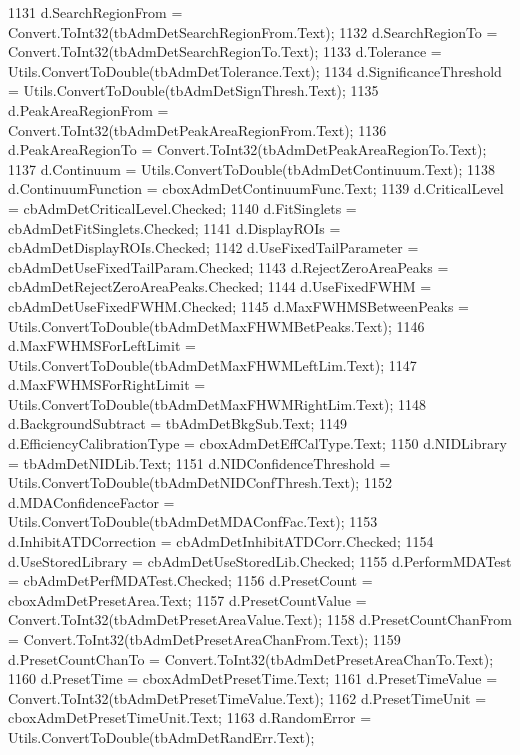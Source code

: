 \begin{DoxyCode}
1131                 d.SearchRegionFrom = Convert.ToInt32(tbAdmDetSearchRegionFrom.Text);
1132                 d.SearchRegionTo = Convert.ToInt32(tbAdmDetSearchRegionTo.Text);
1133                 d.Tolerance = Utils.ConvertToDouble(tbAdmDetTolerance.Text);
1134                 d.SignificanceThreshold = Utils.ConvertToDouble(tbAdmDetSignThresh.Text);
1135                 d.PeakAreaRegionFrom = Convert.ToInt32(tbAdmDetPeakAreaRegionFrom.Text);
1136                 d.PeakAreaRegionTo = Convert.ToInt32(tbAdmDetPeakAreaRegionTo.Text);
1137                 d.Continuum = Utils.ConvertToDouble(tbAdmDetContinuum.Text);
1138                 d.ContinuumFunction = cboxAdmDetContinuumFunc.Text;
1139                 d.CriticalLevel = cbAdmDetCriticalLevel.Checked;
1140                 d.FitSinglets = cbAdmDetFitSinglets.Checked;
1141                 d.DisplayROIs = cbAdmDetDisplayROIs.Checked;
1142                 d.UseFixedTailParameter = cbAdmDetUseFixedTailParam.Checked;
1143                 d.RejectZeroAreaPeaks = cbAdmDetRejectZeroAreaPeaks.Checked;
1144                 d.UseFixedFWHM = cbAdmDetUseFixedFWHM.Checked;
1145                 d.MaxFWHMSBetweenPeaks = Utils.ConvertToDouble(tbAdmDetMaxFHWMBetPeaks.Text);
1146                 d.MaxFWHMSForLeftLimit = Utils.ConvertToDouble(tbAdmDetMaxFHWMLeftLim.Text);
1147                 d.MaxFWHMSForRightLimit = Utils.ConvertToDouble(tbAdmDetMaxFHWMRightLim.Text);
1148                 d.BackgroundSubtract = tbAdmDetBkgSub.Text;
1149                 d.EfficiencyCalibrationType = cboxAdmDetEffCalType.Text;
1150                 d.NIDLibrary = tbAdmDetNIDLib.Text;
1151                 d.NIDConfidenceThreshold = Utils.ConvertToDouble(tbAdmDetNIDConfThresh.Text);
1152                 d.MDAConfidenceFactor = Utils.ConvertToDouble(tbAdmDetMDAConfFac.Text);
1153                 d.InhibitATDCorrection = cbAdmDetInhibitATDCorr.Checked;
1154                 d.UseStoredLibrary = cbAdmDetUseStoredLib.Checked;
1155                 d.PerformMDATest = cbAdmDetPerfMDATest.Checked;
1156                 d.PresetCount = cboxAdmDetPresetArea.Text;
1157                 d.PresetCountValue = Convert.ToInt32(tbAdmDetPresetAreaValue.Text);
1158                 d.PresetCountChanFrom = Convert.ToInt32(tbAdmDetPresetAreaChanFrom.Text);
1159                 d.PresetCountChanTo = Convert.ToInt32(tbAdmDetPresetAreaChanTo.Text);
1160                 d.PresetTime = cboxAdmDetPresetTime.Text;
1161                 d.PresetTimeValue = Convert.ToInt32(tbAdmDetPresetTimeValue.Text);
1162                 d.PresetTimeUnit = cboxAdmDetPresetTimeUnit.Text;
1163                 d.RandomError = Utils.ConvertToDouble(tbAdmDetRandErr.Text);

\end{DoxyCode}
